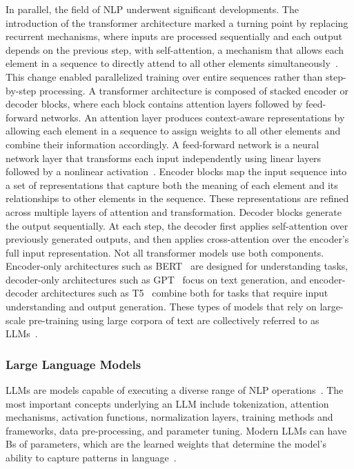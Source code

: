 \documentclass[
english,                 %
bibtex,                  %
includeExtraAbstracts, %
]{kththesis}
\numberwithin{listing}{chapter}
\begin{document}
In parallel, the field of \gls{NLP} underwent significant developments. The introduction of the transformer architecture marked a turning point by replacing recurrent mechanisms, where inputs are processed sequentially and each output depends on the previous step, with self-attention, a mechanism that allows each element in a sequence to directly attend to all other elements simultaneously~\cite{vaswani_attention_2017}. This change enabled parallelized training over entire sequences rather than step-by-step processing. A transformer architecture is composed of stacked encoder or decoder blocks, where each block contains attention layers followed by feed-forward networks. An attention layer produces context-aware representations by allowing each element in a sequence to assign weights to all other elements and combine their information accordingly. A feed-forward network is a neural network layer that transforms each input independently using linear layers followed by a nonlinear activation~\cite{huang_da-code_2024}. Encoder blocks map the input sequence into a set of representations that capture both the meaning of each element and its relationships to other elements in the sequence. These representations are refined across multiple layers of attention and transformation. Decoder blocks generate the output sequentially. At each step, the decoder first applies self-attention over previously generated outputs, and then applies cross-attention over the encoder’s full input representation. Not all transformer models use both components. Encoder-only architectures such as \gls{BERT}~\cite{devlin_bert_2019} are designed for understanding tasks, decoder-only architectures such as \gls{GPT}~\cite{radford_improving_2018} focus on text generation, and encoder-decoder architectures such as T5~\cite{raffel_exploring_2023} combine both for tasks that require input understanding and output generation. These types of models that rely on large-scale pre-training using large corpora of text are collectively referred to as \glspl{LLM}~\cite{bandi_power_2023}.

\subsubsection{Large Language Models}

\Glspl{LLM} are models capable of executing a diverse range of \gls{NLP} operations~\cite{raiaan_review_2024}. The most important concepts underlying an \gls{LLM} include tokenization, attention mechanisms, activation functions, normalization layers, training methods and frameworks, data pre-processing, and parameter tuning. Modern \glspl{LLM} can have \glspl{B} of parameters, which are the learned weights that determine the model’s ability to capture patterns in language~\cite{brown_language_2020}.
\end{document}
